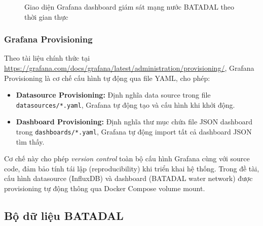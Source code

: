 \begin{figure}[H]
  \centering
  \setlength{\fboxsep}{12pt}
  \caption{Giao diện Grafana dashboard giám sát mạng nước BATADAL theo thời gian thực}
  \label{fig:grafana-dashboard}
\end{figure}

\subsubsection{Grafana Provisioning}

Theo tài liệu chính thức tại
\url{https://grafana.com/docs/grafana/latest/administration/provisioning/},
Grafana Provisioning là cơ chế cấu hình tự động qua file YAML, cho phép:

\begin{itemize}
  \item \textbf{Datasource Provisioning:} Định nghĩa data source trong file
    \texttt{datasources/*.yaml}, Grafana tự động tạo và cấu hình khi khởi động.
  \item \textbf{Dashboard Provisioning:} Định nghĩa thư mục chứa file JSON
    dashboard trong \texttt{dashboards/*.yaml}, Grafana tự động import tất cả
    dashboard JSON tìm thấy.
\end{itemize}

Cơ chế này cho phép \emph{version control} toàn bộ cấu hình Grafana cùng với
source code, đảm bảo tính tái lập (reproducibility) khi triển khai hệ thống. Trong
đề tài, cấu hình datasource (InfluxDB) và dashboard (BATADAL water network) được
provisioning tự động thông qua Docker Compose volume mount.

\subsection{Bộ dữ liệu BATADAL}

